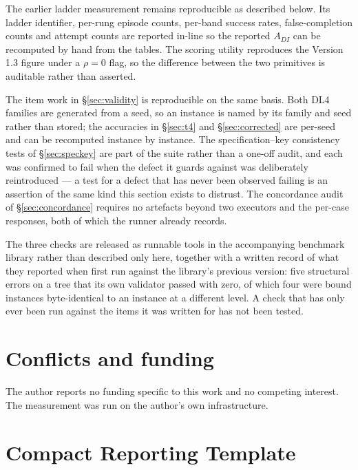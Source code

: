 \documentclass[11pt]{article}
\theoremstyle{definition}
\begin{document}
The earlier ladder measurement remains reproducible as described below. Its ladder identifier, per-rung episode counts, per-band success rates, false-completion counts and attempt counts are reported in-line so the reported $A_{DI}$ can be recomputed by hand from the tables. The scoring utility reproduces the Version 1.3 figure under a $\rho = 0$ flag, so the difference between the two primitives is auditable rather than asserted.

The item work in \S\ref{sec:validity} is reproducible on the same basis. Both DL4 families are generated from a seed, so an instance is named by its family and seed rather than stored; the accuracies in \S\ref{sec:t4} and \S\ref{sec:corrected} are per-seed and can be recomputed instance by instance. The specification--key consistency tests of \S\ref{sec:speckey} are part of the suite rather than a one-off audit, and each was confirmed to fail when the defect it guards against was deliberately reintroduced --- a test for a defect that has never been observed failing is an assertion of the same kind this section exists to distrust. The concordance audit of \S\ref{sec:concordance} requires no artefacts beyond two executors and the per-case responses, both of which the runner already records.

The three checks are released as runnable tools in the accompanying benchmark library rather than described only here, together with a written record of what they reported when first run against the library's previous version: five structural errors on a tree that its own validator passed with zero, of which four were bound instances byte-identical to an instance at a different level. A check that has only ever been run against the items it was written for has not been tested.

\section*{Conflicts and funding}

The author reports no funding specific to this work and no competing interest. The measurement was run on the author's own infrastructure.




\appendix

\section{Compact Reporting Template}
\end{document}
